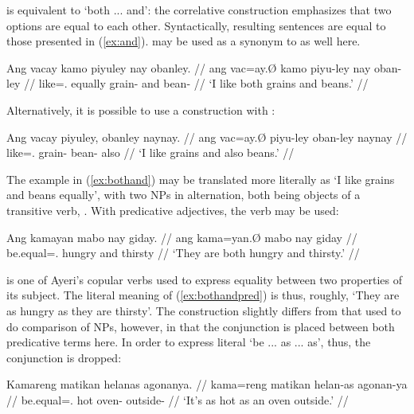 
 is equivalent to 
`both ... and': the correlative construction emphasizes that two options are 
equal to each other. Syntactically, resulting sentences are equal to those
presented in (\ref{ex:and}).  may be used as a synonym 
to  as well here.

\ex\label{ex:bothand}
\begingl
	\gla Ang vacay kamo piyuley nay obanley. //
	\glb ang vac=ay.Ø kamo piyu-ley nay oban-ley //
	\glc \AgtT{} like=\Fsg{}.\Top{} equally grain-\PargI{} and
		bean-\PargI{} //
	\glft `I like both grains and beans.' //
\endgl
\xe

Alternatively, it is possible to use a construction with 
:

\ex
\begingl
	\gla Ang vacay piyuley, obanley naynay. //
	\glb ang vac=ay.Ø piyu-ley oban-ley naynay //
	\glc \AgtT{} like=\Fsg{}.\Top{} grain-\PargI{} bean-\PargI{} also //
	\glft `I like grains and also beans.' //
\endgl
\xe

The example in (\ref{ex:bothand}) may be translated more literally as `I like
grains and beans equally', with two NPs in alternation, both being objects of a
transitive verb, . With predicative adjectives, the
verb  may be used:

\ex\label{ex:bothandpred}
\begingl
	\gla Ang kamayan mabo nay giday. //
	\glb ang kama=yan.Ø mabo nay giday //
	\glc \AgtT{} be.equal=\TplM{}.\Top{} hungry and thirsty //
	\glft `They are both hungry and thirsty.' //
\endgl
\xe

 is one of Ayeri's copular verbs used to express equality 
between two properties of its subject. The literal meaning of 
(\ref{ex:bothandpred}) is thus, roughly, `They are as hungry as they are 
thirsty'. The construction slightly differs from that used to do comparison of 
NPs, however, in that the conjunction  is placed between both 
predicative terms here. In order to express literal `be ... as ... as', thus, 
the conjunction is dropped:

\ex\label{ex:asas}
\begingl
	\gla Kamareng matikan helanas agonanya. //
	\glb kama=reng matikan helan-as agonan-ya //
	\glc be.equal=\TsgI{}.\Aarg{} hot oven-\Parg{} outside-\Loc{} //
	\glft `It's as hot as an oven outside.' //
\endgl
\xe


